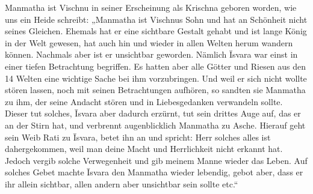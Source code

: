 \documentclass{article}
\begin{document}
Manmatha ist Vischnu in seiner Erscheinung als Krischna geboren worden, wie uns ein Heide schreibt: „Manmatha ist Vischnus Sohn und hat an Schönheit nicht seines Gleichen. Ehemals hat er eine sichtbare Gestalt gehabt und ist lange König in der Welt gewesen, hat auch hin und wieder in allen Welten herum wandern können. Nachmals aber ist er unsichtbar geworden. Nämlich \={I}svara war einst in einer tiefen Betrachtung begriffen. Es hatten aber alle Götter und Riesen aus den 14 Welten eine wichtige Sache bei ihm vorzubringen. Und weil er sich nicht wollte stören lassen, noch mit seinen Betrachtungen aufhören, so sandten sie Manmatha zu ihm, der seine Andacht stören und in Liebesgedanken verwandeln sollte. Dieser tut solches, \={I}svara aber dadurch erzürnt, tut sein drittes Auge auf, das er an der Stirn hat, und verbrennt augenblicklich Manmatha zu Asche. Hierauf geht sein Weib Rati zu \={I}svara, betet ihn an und spricht: Herr solches alles ist dahergekommen, weil man deine Macht und Herrlichkeit nicht erkannt hat. Jedoch vergib solche Verwegenheit und gib meinem Manne wieder das Leben. Auf solches Gebet machte \={I}svara den Manmatha wieder lebendig, gebot aber, dass er ihr allein sichtbar, allen andern aber unsichtbar sein sollte etc.“
\end{document}
